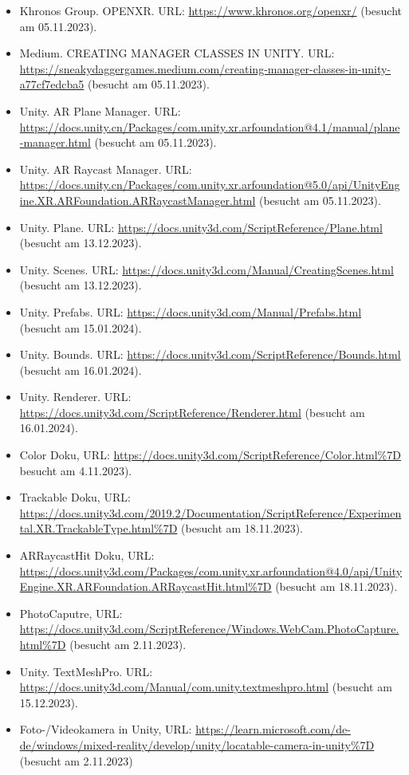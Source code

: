 \begin{itemize}
    \item Khronos Group. OPENXR. URL: \url{https://www.khronos.org/openxr/} (besucht am 05.11.2023).
    \item Medium. CREATING MANAGER CLASSES IN UNITY. URL: \url{https://sneakydaggergames.medium.com/creating-manager-classes-in-unity-a77cf7edcba5} (besucht am 05.11.2023).
    \item Unity. AR Plane Manager. URL: \url{https://docs.unity.cn/Packages/com.unity.xr.arfoundation@4.1/manual/plane-manager.html} (besucht am 05.11.2023).
    \item Unity. AR Raycast Manager. URL: \url{https://docs.unity.cn/Packages/com.unity.xr.arfoundation@5.0/api/UnityEngine.XR.ARFoundation.ARRaycastManager.html} (besucht am 05.11.2023).
    \item Unity. Plane. URL: \url{https://docs.unity3d.com/ScriptReference/Plane.html} (besucht am 13.12.2023).
    \item Unity. Scenes. URL: \url{https://docs.unity3d.com/Manual/CreatingScenes.html} (besucht am 13.12.2023).
    \item Unity. Prefabs. URL: \url{https://docs.unity3d.com/Manual/Prefabs.html} (besucht am 15.01.2024).
    \item Unity. Bounds. URL: \url{https://docs.unity3d.com/ScriptReference/Bounds.html} (besucht am 16.01.2024).
    \item Unity. Renderer. URL: \url{https://docs.unity3d.com/ScriptReference/Renderer.html} (besucht am 16.01.2024).
    \item Color Doku, URL:  \url{https://docs.unity3d.com/ScriptReference/Color.html%7D} besucht am 4.11.2023).
    \item Trackable Doku, URL:  \url{https://docs.unity3d.com/2019.2/Documentation/ScriptReference/Experimental.XR.TrackableType.html%7D} (besucht am 18.11.2023).
    \item ARRaycastHit Doku, URL:  \url{https://docs.unity3d.com/Packages/com.unity.xr.arfoundation@4.0/api/UnityEngine.XR.ARFoundation.ARRaycastHit.html%7D} (besucht am 18.11.2023).
    \item PhotoCaputre, URL:  \url{https://docs.unity3d.com/ScriptReference/Windows.WebCam.PhotoCapture.html%7D} (besucht am 2.11.2023).
    \item Unity. TextMeshPro. URL: \url{https://docs.unity3d.com/Manual/com.unity.textmeshpro.html} (besucht am 15.12.2023).
    \item Foto-/Videokamera in Unity, URL:  \url{https://learn.microsoft.com/de-de/windows/mixed-reality/develop/unity/locatable-camera-in-unity%7D} (besucht am 2.11.2023)

\end{itemize}
